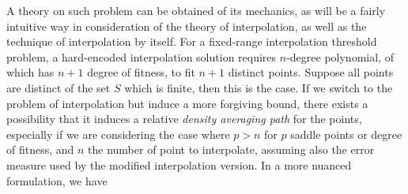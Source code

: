 A theory on such problem can be obtained of its mechanics, as will be a fairly intuitive way in consideration of the theory of interpolation, as well as the technique of interpolation by itself. For a fixed-range interpolation threshold problem, a hard-encoded interpolation solution requires $n$-degree polynomial, of which has $n+1$ degree of fitness, to fit $n+1$ distinct points. Suppose all points are distinct of the set $S$ which is finite, then this is the case. If we switch to the problem of interpolation but induce a more forgiving bound, there exists a possibility that it induces a relative \textit{density averaging path} for the points, especially if we are considering the case where $p>n$ for $p$ saddle points or degree of fitness, and $n$ the number of point to interpolate, assuming also the error measure used by the modified interpolation version. In a more nuanced formulation, we have

